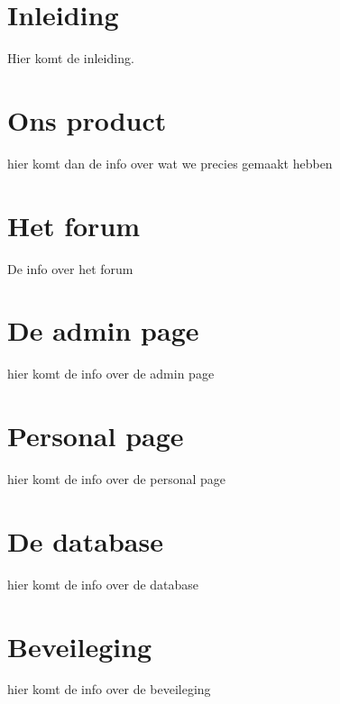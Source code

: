\documentclass[12pt]{article}
\begin{document}
\pagebreak
\maketitle

\pagebreak

\section{Inleiding} 

Hier komt de inleiding.

\pagebreak


\section{Ons product}
hier komt dan de info over wat we precies gemaakt hebben
\pagebreak

\section{Het forum}
De info over het forum
\pagebreak

\section{De admin page}
hier komt de info over de admin page
\pagebreak

\section{Personal page}
hier komt de info over de personal page
\pagebreak

\section{De database}
hier komt de info over de database
\pagebreak

\section{Beveileging}
hier komt de info over de beveileging
\pagebreak

\tableofcontents
{}
\end{document}
